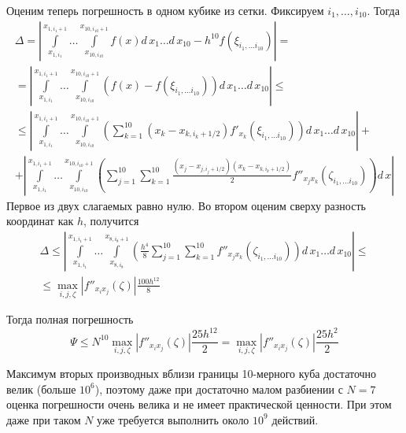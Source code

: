 \documentclass[12pt, a4paper]{article}
\begin{document}
Оценим теперь погрешность в одном кубике из сетки. Фиксируем $i_1,\ldots,i_{10}$. Тогда 
\begin{gather*} \Delta = 
\left| \int\limits_{x_{1,i_1}}^{x_{1,i_1 + 1}}\dots\int\limits_{x_{10,i_{10}}}^{x_{10,i_{10} + 1}} 
	f(x) d\,x_1\dots d\, x_{10} - h^{10} f\left(\xi_{i_1,\ldots i_{10}}\right)  \right|
   = \\ =
\left| \int\limits_{x_{1,i_1}}^{x_{1,i_1 + 1}}\dots\int\limits_{x_{10,i_{10}}}^{x_{10,i_{10} + 1}} 
	\left( f(x) - f\left(\xi_{i_1,\ldots i_{10}}\right) \right) d\,x_1\dots d\, x_{10} \right|
	\leqslant \\ \leqslant
\left| \int\limits_{x_{1,i_1}}^{x_{1,i_1 + 1}}\dots\int\limits_{x_{10,i_{10}}}^{x_{10,i_{10} + 1}} 
	\left( 
		\sum\limits_{k=1}^{10}\left( x_k - x_{k,i_k+1/2} \right)f'_{x_k}\left(\xi_{i_1,\ldots i_{10}}\right)
	\right) d\,x_1\dots d\, x_{10} \right|
			+ \\ + 
\left| \int\limits_{x_{1,i_1}}^{x_{1,i_1 + 1}}\dots\int\limits_{x_{10,i_{10}}}^{x_{10,i_{10} + 1}}
	\left(
		\sum\limits_{j=1}^{10} \sum\limits_{k=1}^{10} 
			\frac{\left(x_j-x_{j,i_j+1/2}\right) \left( x_k - x_{k,i_k+1/2} \right) }{2}
			f''_{x_j x_k} \left(\zeta_{{i_1,\ldots i_{10}}}\right) 
	\right) d\,x \right|
\end{gather*}
Первое из двух слагаемых равно нулю. Во втором оценим сверху разность координат как $h$, получится
\begin{gather*}
\Delta \leqslant 
\left| \int\limits_{x_{1,i_1}}^{x_{1,i_1 + 1}}\dots\int\limits_{x_{8,i_{8}}}^{x_{8,i_{8} + 1}}
	\left(
		\frac{h^4}{8}\sum\limits_{j=1}^{10} \sum\limits_{k=1}^{10} 
			f''_{x_j x_k} \left(\zeta_{{i_1,\ldots i_{10}}}\right) 
	\right) d\,x_1\dots d\, x_{10} \right|
	\leqslant \\ \leqslant
	\max\limits_{i,j,\zeta} \left| f''_{x_i x_j}\left( \zeta \right)\right| 
		\frac{100 h^{12}}{8}	
\end{gather*}

Тогда полная погрешность 
\[ 
\Psi \leqslant 
	N^{10}\max\limits_{i,j,\zeta} \left| f''_{x_i x_j}\left( \zeta \right)\right| 
		\frac{25h^{12}}{2} = 
	\max\limits_{i,j,\zeta} \left| f''_{x_i x_j}\left( \zeta \right)\right| 
			\frac{25h^{2}}{2}
\]

Максимум вторых производных вблизи границы 10-мерного куба достаточно велик (больше $10^6$), поэтому даже при достаточно малом разбиении с $N=7$ оценка погрешности очень велика и не имеет практической ценности. При этом даже при таком $N$ уже требуется выполнить около $10^9$ действий.
\end{document}
